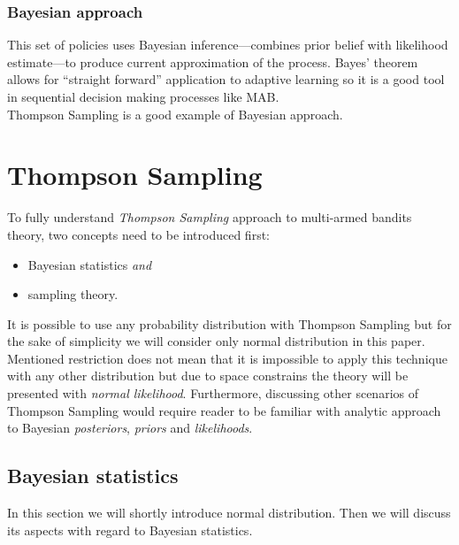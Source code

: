\documentclass[12pt, a4paper, pdflatex, leqno]{report}
\begin{document}

\subsubsection{Bayesian approach}
This set of policies uses Bayesian inference---combines prior belief with likelihood estimate---to produce current approximation of the process. Bayes' theorem allows for ``straight forward'' application to adaptive learning so it is a good tool in sequential decision making processes like MAB.\\
Thompson Sampling is a good example of Bayesian approach.\\








\section{Thompson Sampling\label{sec:thompsonsampling}}
To fully understand \emph{Thompson Sampling} approach to multi-armed bandits theory, two concepts need to be introduced first:
\begin{itemize}
\item Bayesian statistics \textit{and}
\item sampling theory.
\end{itemize}
It is possible to use any probability distribution with Thompson Sampling but for the sake of simplicity we will consider only normal distribution in this paper. Mentioned restriction does not mean that it is impossible to apply this technique with any other distribution but due to space constrains the theory will be presented with \emph{normal likelihood}. Furthermore, discussing other scenarios of Thompson Sampling would require reader to be familiar with analytic approach to Bayesian \emph{posteriors}, \emph{priors} and \emph{likelihoods}.

\subsection{Bayesian statistics\label{sec:bayesian}}
In this section we will shortly introduce normal distribution. Then we will discuss its aspects with regard to Bayesian statistics.
\end{document}
